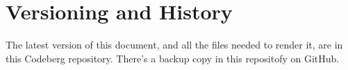 \section{Versioning and History}
\label{sec:versions}

The latest version of this document, and all the files needed to
render it, are in this Codeberg repository. There's a backup copy in
this repositofy on GitHub.

